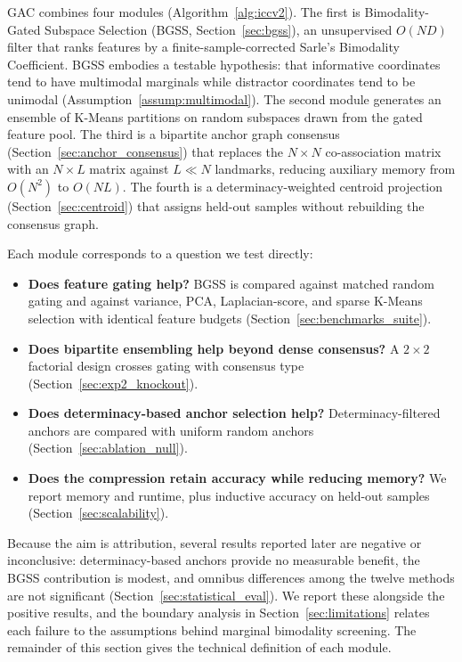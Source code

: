\documentclass[pdflatex,sn-mathphys-num]{sn-jnl}
\theoremstyle{thmstyleone}
\theoremstyle{thmstyletwo}
\theoremstyle{thmstylethree}
\begin{document}
GAC combines four modules (Algorithm~\ref{alg:iccv2}). The first is Bimodality-Gated Subspace Selection (BGSS, Section~\ref{sec:bgss}), an unsupervised $O(ND)$ filter that ranks features by a finite-sample-corrected Sarle's Bimodality Coefficient. BGSS embodies a testable hypothesis: that informative coordinates tend to have multimodal marginals while distractor coordinates tend to be unimodal (Assumption~\ref{assump:multimodal}). The second module generates an ensemble of K-Means partitions on random subspaces drawn from the gated feature pool. The third is a bipartite anchor graph consensus (Section~\ref{sec:anchor_consensus}) that replaces the $N \times N$ co-association matrix with an $N \times L$ matrix against $L \ll N$ landmarks, reducing auxiliary memory from $O(N^2)$ to $O(NL)$. The fourth is a determinacy-weighted centroid projection (Section~\ref{sec:centroid}) that assigns held-out samples without rebuilding the consensus graph.

Each module corresponds to a question we test directly:
\begin{itemize}
    \item \textbf{Does feature gating help?} BGSS is compared against matched random gating and against variance, PCA, Laplacian-score, and sparse K-Means selection with identical feature budgets (Section~\ref{sec:benchmarks_suite}).
    \item \textbf{Does bipartite ensembling help beyond dense consensus?} A $2 \times 2$ factorial design crosses gating with consensus type (Section~\ref{sec:exp2_knockout}).
    \item \textbf{Does determinacy-based anchor selection help?} Determinacy-filtered anchors are compared with uniform random anchors (Section~\ref{sec:ablation_null}).
    \item \textbf{Does the compression retain accuracy while reducing memory?} We report memory and runtime, plus inductive accuracy on held-out samples (Section~\ref{sec:scalability}).
\end{itemize}

Because the aim is attribution, several results reported later are negative or inconclusive: determinacy-based anchors provide no measurable benefit, the BGSS contribution is modest, and omnibus differences among the twelve methods are not significant (Section~\ref{sec:statistical_eval}). We report these alongside the positive results, and the boundary analysis in Section~\ref{sec:limitations} relates each failure to the assumptions behind marginal bimodality screening. The remainder of this section gives the technical definition of each module.
\end{document}
